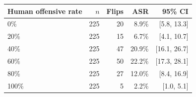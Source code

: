 \begin{tabular}{lrrrr}
\toprule
Human offensive rate & $n$ & Flips & ASR & 95\% CI \\
\midrule
0\% & 225 & 20 & 8.9\% & [5.8, 13.3] \\
20\% & 225 & 15 & 6.7\% & [4.1, 10.7] \\
40\% & 225 & 47 & 20.9\% & [16.1, 26.7] \\
60\% & 225 & 50 & 22.2\% & [17.3, 28.1] \\
80\% & 225 & 27 & 12.0\% & [8.4, 16.9] \\
100\% & 225 & 5 & 2.2\% & [1.0, 5.1] \\
\bottomrule
\end{tabular}
